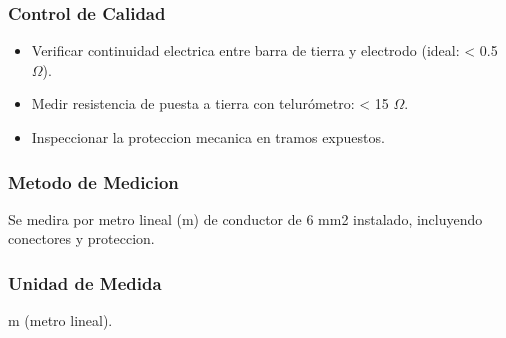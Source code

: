 \subsubsection{Control de Calidad}

\begin{itemize}
  \item Verificar continuidad electrica entre barra de tierra y electrodo (ideal: < 0.5 $\Omega$).
  \item Medir resistencia de puesta a tierra con telurómetro: < 15 $\Omega$.
  \item Inspeccionar la proteccion mecanica en tramos expuestos.
\end{itemize}

\subsubsection{Metodo de Medicion}

Se medira por metro lineal (m) de conductor de 6 mm2 instalado, incluyendo conectores y proteccion.

\subsubsection{Unidad de Medida}

m (metro lineal).
